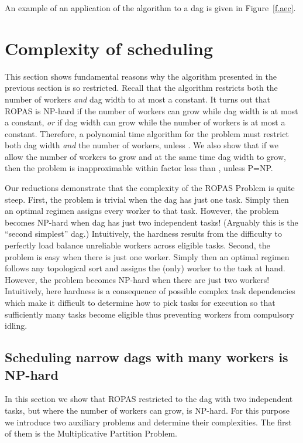 \documentclass[letterpaper,11pt]{article}
\begin{document}
An example of an application of the algorithm to a dag is given in Figure~\ref{f.aec}. 




\section{Complexity of scheduling}
\label{s.complexity}

This section shows fundamental reasons why the algorithm presented in the previous section is so restricted. Recall that the algorithm restricts both the number of workers {\em and} dag width to at most a constant. It turns out that ROPAS is NP-hard if the number of workers can grow while dag width is at most a constant, {\em or} if dag width can grow while the number of workers is at most a constant. Therefore, a polynomial time algorithm for the problem must restrict both dag width {\em and} the number of workers, unless . We also show that if we allow the number of workers to grow and at the same time dag width to grow, then the problem is inapproximable within factor less than , unless P=NP.

Our reductions demonstrate that the complexity of the ROPAS Problem is quite steep. 
First, the problem is trivial when the dag has just one task. Simply then an optimal regimen assigns every worker to that task. However, the problem becomes NP-hard when dag has just two independent tasks! (Arguably this is the ``second simplest'' dag.) Intuitively, the hardness results from the difficulty to perfectly load balance unreliable workers across eligible tasks.
Second, the problem is easy when there is just one worker. Simply then an optimal regimen follows any topological sort and assigns the (only) worker to the task at hand. However, the problem becomes NP-hard when there are just two workers! Intuitively, here hardness is a consequence of possible complex task dependencies which make it difficult to determine how to pick tasks for execution so that sufficiently many tasks become eligible thus preventing workers from compulsory idling.


\subsection{Scheduling narrow dags with many workers is NP-hard}
\label{s.narrow_many}

In this section we show that ROPAS restricted to the dag with two independent tasks, but where the number of workers can grow, is NP-hard. For this purpose we introduce two auxiliary problems and determine their complexities. The first of them is the Multiplicative Partition Problem.
\end{document}
